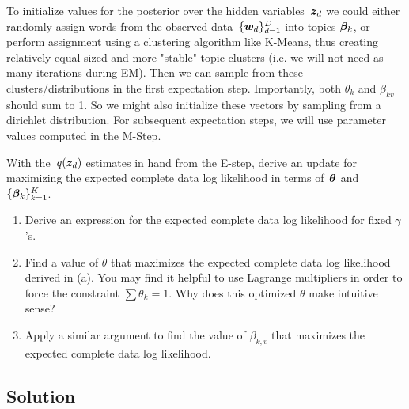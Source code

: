 \documentclass[submit]{harvardml}
\begin{document}
To initialize values for the posterior over the hidden variables~$\boldsymbol{z}_d$ we could either randomly assign words from the observed data~$\{\boldsymbol{w}_d\}^D_{d=1}$ into topics $\boldsymbol{\beta}_k$, or perform assignment using a clustering algorithm like K-Means, thus creating relatively equal sized and more "stable" topic clusters (i.e. we will not need as many iterations during EM). Then we can sample from these clusters/distributions in the first expectation step. Importantly, both $\theta_k$ and $\beta_{kv}$ should sum to 1. So we might also initialize these vectors by sampling from a dirichlet distribution. For subsequent expectation steps, we will use parameter values computed in the M-Step. 


\newpage

\begin{problem}
With the~$q(\boldsymbol{z}_d)$ estimates in hand from the E-step, derive an update for maximizing the expected complete data log likelihood in terms of~$\boldsymbol{\theta}$ and~$\{\boldsymbol{\beta}_k\}^K_{k=1}$.

\begin{enumerate}[label=(\alph*)]
    \item Derive an expression for the expected complete data log likelihood for fixed $\gamma$'s. 
    \item Find a value of $\theta$ that maximizes the expected complete data log likelihood derived in (a). You may find it helpful to use Lagrange multipliers in order to force the constraint $\sum \theta_k = 1$. Why does this optimized $\theta$ make intuitive sense?
    \item Apply a similar argument to find the value of $\beta_{k, v}$ that maximizes the expected complete data log likelihood. 
\end{enumerate}

\end{problem}
\subsection*{Solution}
\end{document}
